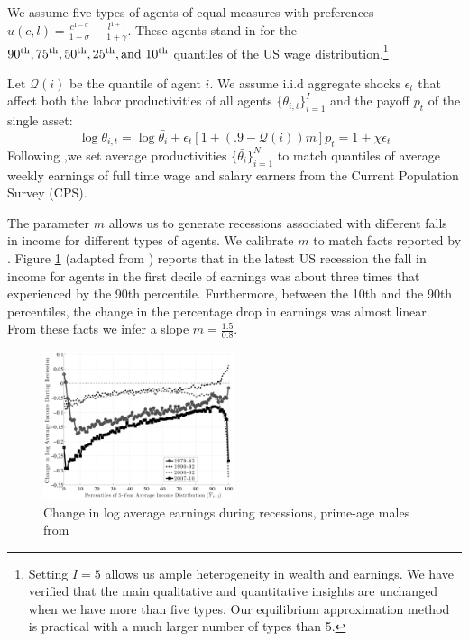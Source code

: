 \documentclass[thmsb,11pt]{article}
\begin{document}
We assume  five types of agents of equal measures with preferences $u(c,l)=\frac{c^{1-\sigma}}{1-\sigma}-\frac{l^{1+\gamma}}{1+\gamma}$.
These agents stand in for  the $90\textsuperscript{th},75\textsuperscript{th},50\textsuperscript{th},25\textsuperscript{th},  \text{and } 10\textsuperscript{th}$ quantiles
of the  US wage distribution.\footnote{Setting  $I=5$ allows us ample heterogeneity in wealth and earnings. We have verified that the main qualitative and quantitative insights are unchanged when  we
have more than five types.
Our equilibrium approximation method is practical with a much larger  number of types than 5. }

Let $\mathcal{Q}(i)$ be the quantile of agent $i$. We assume i.i.d aggregate shocks $\epsilon_t$ that affect both the labor productivities of all agents $\{\theta_{i,t}\}^{I}_{i=1}$ and the  payoff $p_t$ of the single asset:
\begin{subequations}
\begin{equation} \label{wage equation calibration}
 \log \theta_{i,t}=\log\bar{\theta_i}+ \epsilon_t[1+(.9-\mathcal{Q}(i))m]
\end{equation}
 \begin{equation}
p_t=1+\chi \epsilon_t
 \end{equation}

\end{subequations}
Following \cite{Autor2008},we set average productivities $\{\bar{\theta_i}\}^{N}_{i=1}$  to match
quantiles of  average weekly earnings of full time wage and salary earners from the Current Population Survey (CPS).

The parameter $m$ allows us to generate recessions associated with different  falls in income for different types of agents.
We calibrate $m$ to match  facts reported by \citet{Fatih2014}.
Figure \ref{fig:fatih_picture} (adapted from \citeauthor{Fatih2014}) reports that in the latest US recession the fall in income for  agents in the first decile of earnings was about  three times
that experienced by the 90th percentile. Furthermore, between the 10th and the 90th  percentiles, the change in the percentage drop in earnings was almost linear.
From these facts we infer a slope  $m=\frac{1.5}{0.8}$.

 {
  \begin{figure}
    \centering
    \includegraphics[width = 0.5\textwidth]{fg13.jpeg}
    \caption{ Change in log average earnings during recessions, prime-age males from \cite{Fatih2014}}
      \label{fig:fatih_picture}
  \end{figure}

}
\end{document}
